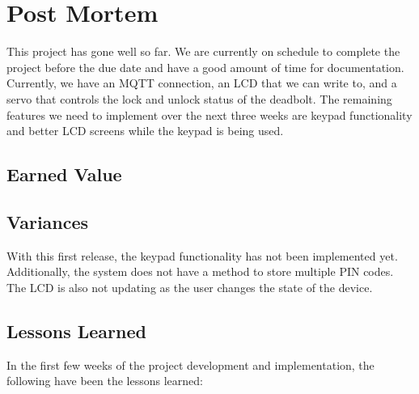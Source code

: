 \chapter{Post Mortem}
This project has gone well so far. We are currently on schedule to complete the project before the due date and have a good amount of time for documentation. Currently, we have an MQTT connection, an LCD that we can write to, and a servo that controls the lock and unlock status of the deadbolt. The remaining features we need to implement over the next three weeks are keypad functionality and better LCD screens while the keypad is being used.
\section{Earned Value}

\section{Variances}
With this first release, the keypad functionality has not been implemented yet. Additionally, the system does not have a method to store multiple PIN codes. The LCD is also not updating as the user changes the state of the device.

\section{Lessons Learned}
In the first few weeks of the project development and implementation, the following have been the lessons learned: 

